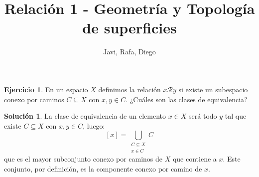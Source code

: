 \documentclass{article}
\theoremstyle{plain}
\theoremstyle{definition}
\newtheorem{exercise}{Ejercicio}
\newtheorem*{sol*}{Solución}
\begin{document}
\title{Relación 1 - Geometría y Topología de superficies }
\author{Javi, Rafa, Diego}
\maketitle
\begin{exercise}
En un espacio $X$ definimos la relación $x \mathcal{R} y$ si existe un subespacio conexo por caminos $C \subseteq X$ con $x,y \in C$. ¿Cuáles son las clases de equivalencia?
\end{exercise}
\begin{sol*}
La clase de equivalencia de un elemento $x \in X$ será todo $y$ tal que existe $C \subseteq X$ con $x, y \in C$, luego:
\[ [x] = \bigcup_{\substack{C \subseteq X \\ x \in C}} C \]
que es el mayor subconjunto conexo por caminos de $X$ que contiene a $x$. Este conjunto, por definición, es la componente conexo por camino de $x$.
\end{sol*}
\end{document}
